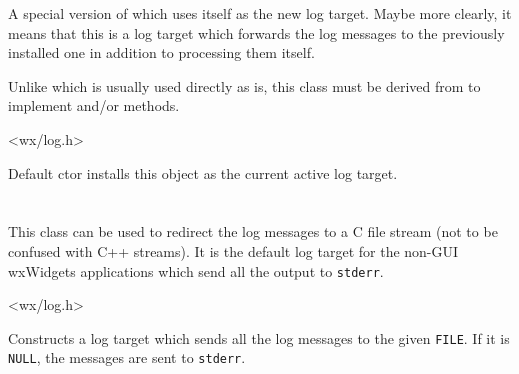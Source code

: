 A special version of  which uses itself as the
new log target. Maybe more clearly, it means that this is a log target which
forwards the log messages to the previously installed one in addition to
processing them itself.

Unlike  which is usually used directly as is,
this class must be derived from to implement 
and/or  methods.




<wx/log.h>


\label{wxlogpassthroughctor}

Default ctor installs this object as the current active log target.


\section{}\label{wxlogstderr}

This class can be used to redirect the log messages to a C file stream (not to
be confused with C++ streams). It is the default log target for the non-GUI
wxWidgets applications which send all the output to {\tt stderr}.




<wx/log.h>




\label{wxlogstderrctor}


Constructs a log target which sends all the log messages to the given
{\tt FILE}. If it is {\tt NULL}, the messages are sent to {\tt stderr}.

